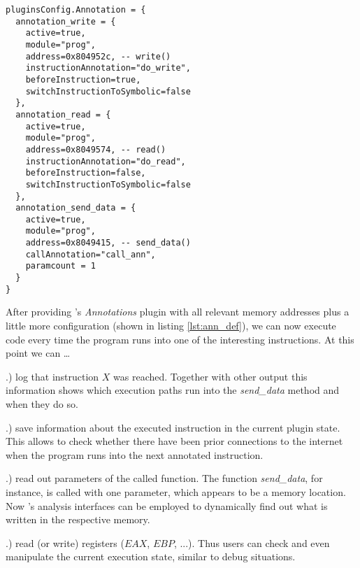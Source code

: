 
\bigskip
\begin{lstlisting}[language={[5.0]Lua}, basicstyle=\ttfamily\footnotesize, caption={Configuration of the \textit{Annotations} plugin (part). Defines the instructions to be monitored and actions to trigger upon execution of these instructions. Note the link to the binary in listing \ref{lst:ass} via memory addresses.}, label={lst:ann_def}]
pluginsConfig.Annotation = {
  annotation_write = {
    active=true,
    module="prog",
    address=0x804952c, -- write()
    instructionAnnotation="do_write",
    beforeInstruction=true,
    switchInstructionToSymbolic=false
  },
  annotation_read = {
    active=true,
    module="prog",
    address=0x8049574, -- read()
    instructionAnnotation="do_read",
    beforeInstruction=false, 
    switchInstructionToSymbolic=false
  },
  annotation_send_data = {
    active=true,
    module="prog",
    address=0x8049415, -- send_data()
    callAnnotation="call_ann",
    paramcount = 1
  }
}
\end{lstlisting}
\bigskip


After providing \sse's \textit{Annotations} plugin with all relevant memory addresses plus a little more configuration (shown in listing \ref{lst:ann_def}), we can now execute code every time the program runs into one of the interesting instructions.
At this point we can \ldots

.) log that instruction $X$ was reached.
Together with other \sse output this information shows which execution paths run into the \textit{send\_data} method and when they do so.

.) save information about the executed instruction in the current plugin state.
This allows to check whether there have been prior connections to the internet when the program runs into the next annotated instruction.

.) read out parameters of the called function.
The function \textit{send\_data}, for instance, is called with one parameter, which appears to be a memory location.
Now \sse's analysis interfaces can be employed to dynamically find out what is written in the respective memory.

.) read (or write) registers ($EAX$, $EBP$, ...).
Thus \sse users can check and even manipulate the current execution state, similar to debug situations.

